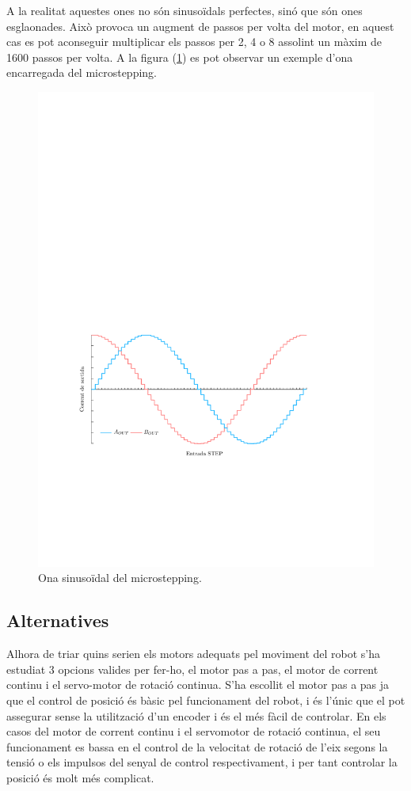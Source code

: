 A la realitat aquestes ones no són sinusoïdals perfectes, sinó que són ones esglaonades. Això provoca un augment de passos per volta del motor, en aquest cas es pot aconseguir multiplicar els passos per 2, 4 o 8 assolint un màxim de 1600 passos per volta. A la figura (\ref{fig:Microstepping}) es pot observar un exemple d’ona encarregada del microstepping. 

\begin{figure}[H]
	\centering
	\includegraphics{Multistepper-grafic}
	\caption{Ona sinusoïdal del microstepping.}
	\label{fig:Microstepping}
\end{figure}

\subsection{Alternatives}
Alhora de triar quins serien els motors adequats pel moviment del robot s'ha estudiat 3 opcions valides per fer-ho, el motor pas a pas, el motor de corrent continu i el servo-motor de rotació continua. S'ha escollit el motor pas a pas ja que el control de posició és bàsic pel funcionament del robot, i és l'únic que el pot assegurar sense la utilització d'un encoder i és el més fàcil de controlar. En els casos del motor de corrent continu i el servomotor de rotació continua, el seu funcionament es bassa en el control de la velocitat de rotació de l'eix segons la tensió o els impulsos del senyal de control respectivament, i per tant controlar la posició és molt més complicat. 



